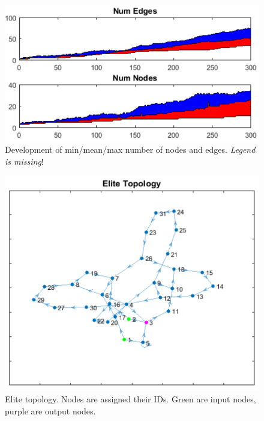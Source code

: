 \documentclass{hbrs-ecta-report}
\begin{document}
\begin{figure}[ht!]
\centering
\includegraphics[width=\linewidth]{img/2.png}
\caption{Development of min/mean/max number of nodes and edges. \textit{Legend is missing}!}
\label{fig:2} 
\end{figure}

\begin{figure}[ht!]
\centering
\includegraphics[width=\linewidth]{img/3.png}
\caption{Elite topology. Nodes are assigned their IDs. Green are input nodes, purple are output nodes.}
\label{fig:3} 
\end{figure}
\end{document}
